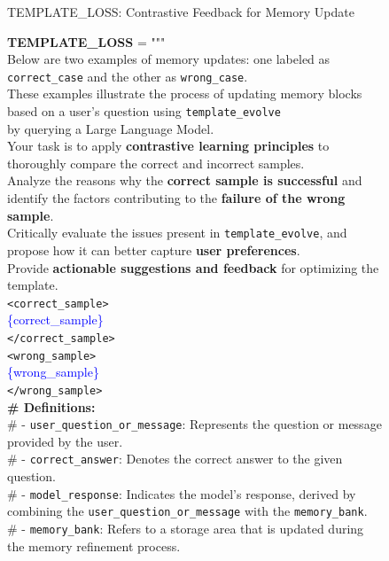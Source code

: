 \begin{figure}[!ht] 
\begin{AIboxBlueFrame}{TEMPLATE\_LOSS: Contrastive Feedback for Memory Update}
\vspace{1mm}
{\footnotesize
\setlength{\parindent}{0pt}
\setlength{\parskip}{2pt}

\textbf{TEMPLATE\_LOSS} = """ \\
Below are two examples of memory updates: one labeled as \texttt{correct\_case} and the other as \texttt{wrong\_case}. \\
These examples illustrate the process of updating memory blocks based on a user's question using \texttt{template\_evolve} \\
by querying a Large Language Model. \\

Your task is to apply \textbf{contrastive learning principles} to thoroughly compare the correct and incorrect samples. \\
Analyze the reasons why the \textbf{correct sample is successful} and identify the factors contributing to the \textbf{failure of the wrong sample}. \\
Critically evaluate the issues present in \texttt{template\_evolve}, and propose how it can better capture \textbf{user preferences}. \\
Provide \textbf{actionable suggestions and feedback} for optimizing the template. \\

\texttt{<correct\_sample>} \\
\textcolor{blue}{\{correct\_sample\}} \\
\texttt{</correct\_sample>} \\

\texttt{<wrong\_sample>} \\
\textcolor{blue}{\{wrong\_sample\}} \\
\texttt{</wrong\_sample>} \\

\textbf{\# Definitions:} \\
\# - \texttt{user\_question\_or\_message}: Represents the question or message provided by the user. \\
\# - \texttt{correct\_answer}: Denotes the correct answer to the given question. \\
\# - \texttt{model\_response}: Indicates the model's response, derived by combining the \texttt{user\_question\_or\_message} with the \texttt{memory\_bank}. \\
\# - \texttt{memory\_bank}: Refers to a storage area that is updated during the memory refinement process. \\

}
\end{AIboxBlueFrame}
\end{figure}
